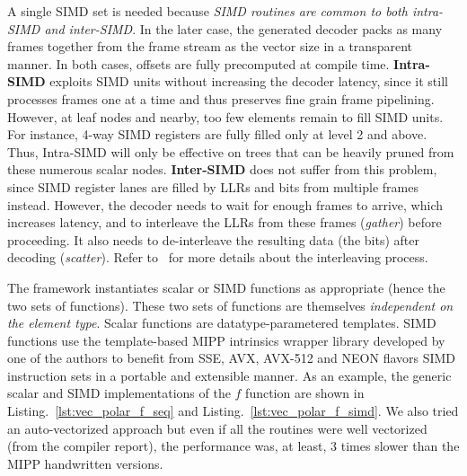 A single SIMD set is needed because \emph{SIMD routines are common to both
intra-SIMD and inter-SIMD}. In the later case, the generated decoder packs as
many frames together from the frame stream as the vector size in a transparent
manner. In both cases, offsets are fully precomputed at compile time.
\textbf{Intra-SIMD} exploits SIMD units without increasing the decoder latency,
since it still processes frames one at a time and thus preserves fine grain
frame pipelining. However, at leaf nodes and nearby, too few elements remain to
fill SIMD units. For instance, 4-way SIMD registers are fully filled only at
level 2 and above. Thus, Intra-SIMD will only be effective on trees that can be
heavily pruned from these numerous scalar nodes. \textbf{Inter-SIMD} does not
suffer from this problem, since SIMD register lanes are filled by LLRs and bits
from multiple frames instead. However, the decoder needs to wait for enough
frames to arrive, which increases latency, and to interleave the LLRs from these
frames (\emph{gather}) before proceeding. It also needs to de-interleave the
resulting data (the bits) after decoding (\emph{scatter}). Refer
to~\cite{LeGal2015a} for more details about the interleaving process.



The framework instantiates scalar or SIMD functions as appropriate (hence the
two sets of functions). These two sets of functions are themselves
\emph{independent on the element type}. Scalar functions are
datatype-parametered templates. SIMD functions use the template-based MIPP
intrinsics wrapper library developed by one of the authors to benefit from SSE,
AVX, AVX-512 and NEON flavors SIMD instruction sets in a portable and extensible
manner. As an example, the generic scalar and SIMD implementations of the $f$
function are shown in Listing.~\ref{lst:vec_polar_f_seq} and
Listing.~\ref{lst:vec_polar_f_simd}. We also tried an auto-vectorized approach
but even if all the routines were well vectorized (from the compiler report),
the performance was, at least, 3 times slower than the MIPP handwritten
versions.

